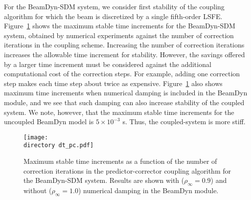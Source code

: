 \documentclass{aiaa-tc}
\def\directory{EPSF/}
\begin{document}
For the BeamDyn-SDM system, we consider first stability of the coupling algorithm for which the beam is discretized by a single fifth-order LSFE. 
Figure~\ref{fig:CoupledDTPC} shows the maximum stable time increments for the BeamDyn-SDM system, obtained by numerical experiments against the number of correction iterations in the coupling scheme.  
Increasing the number of correction iterations increases the allowable time increment for stability.  However, the savings offered by a larger time increment must be considered against the additional computational cost of the correction steps.  
For example, adding one correction step makes each time step about twice as expensive.
Figure~\ref{fig:CoupledDTPC} also shows maximum time increments when numerical damping is included in the BeamDyn module, and we see that such damping can also increase stability of the coupled system.  We note, however, that the maximum stable time increments for the uncoupled BeamDyn model is $5 \times 10^{-3}$ s.  Thus, the coupled-system is more stiff.

\begin{figure}[h!tp]
\centering
\texttt{[image: \\directory dt\_pc.pdf]}
\caption{Maximum stable time increments as a function of the number of correction iterations in the predictor-corrector coupling algorithm for the BeamDyn-SDM system. Results are shown with ($\rho_\infty = 0.9$) and without ($\rho_\infty = 1.0$) numerical damping in the BeamDyn module.
} 
\label{fig:CoupledDTPC}
\end{figure}
\end{document}
